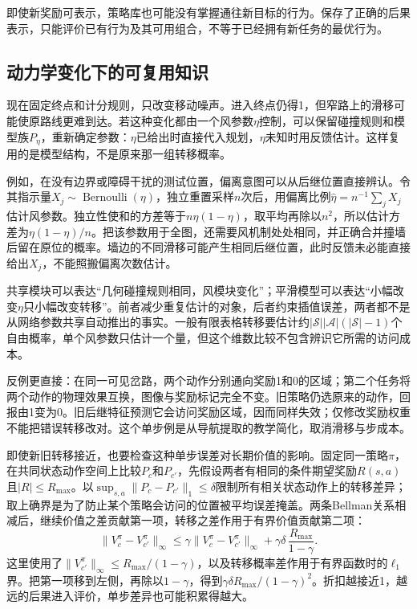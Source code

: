 即使新奖励可表示，策略库也可能没有掌握通往新目标的行为。保存了正确的后果表示，只能评价已有行为及其可用组合，不等于已经拥有新任务的最优行为。

\subsection{动力学变化下的可复用知识}
\label{sec:rl-transfer-dynamics-change}

现在固定终点和计分规则，只改变移动噪声。进入终点仍得1，但窄路上的滑移可能使原路线更难到达。若这种变化都由一个风参数$\eta$控制，可以保留碰撞规则和模型族$P_\eta$，重新确定参数：$\eta$已给出时直接代入规划，$\eta$未知时用反馈估计。这样复用的是模型结构，不是原来那一组转移概率。

例如，在没有边界或障碍干扰的测试位置，偏离意图可以从后继位置直接辨认。令其指示量$X_j\sim\operatorname{Bernoulli}(\eta)$，独立重置采样$n$次后，用偏离比例$\widehat\eta=n^{-1}\sum_jX_j$估计风参数。独立性使和的方差等于$n\eta(1-\eta)$，取平均再除以$n^2$，所以估计方差为$\eta(1-\eta)/n$。把该参数用于全图，还需要风机制处处相同，并正确合并撞墙后留在原位的概率。墙边的不同滑移可能产生相同后继位置，此时反馈未必能直接给出$X_j$，不能照搬偏离次数估计。

共享模块可以表达“几何碰撞规则相同，风模块变化”；平滑模型可以表达“小幅改变$\eta$只小幅改变转移”。前者减少重复估计的对象，后者约束插值误差，两者都不是从网络参数共享自动推出的事实。一般有限表格转移要估计约$|\mathcal S||\mathcal A|(|\mathcal S|-1)$个自由概率，单个风参数只估计一个量，但这个维数比较不包含辨识它所需的访问成本。

反例更直接：在同一可见岔路，两个动作分别通向奖励1和0的区域；第二个任务将两个动作的物理效果互换，图像与奖励标记完全不变。旧策略仍选原来的动作，回报由1变为0。旧后继特征预测它会访问奖励区域，因而同样失效；仅修改奖励权重不能把错误转移改对。这个单步例是从导航提取的教学简化，取消滑移与步成本。

即使新旧转移接近，也要检查这种单步误差对长期价值的影响。固定同一策略$\pi$，在共同状态动作空间上比较$P_c$和$P_{c'}$，先假设两者有相同的条件期望奖励$R(s,a)$且$|R|\leq R_{\max}$。以$\sup_{s,a}\lVert P_c-P_{c'}\rVert_1\leq\delta$限制所有相关状态动作上的转移差异；取上确界是为了防止某个策略会访问的位置被平均误差掩盖。两条Bellman关系相减后，继续价值之差贡献第一项，转移之差作用于有界价值贡献第二项：
\[
 \lVert V_c^\pi-V_{c'}^\pi\rVert_\infty
 \leq \gamma\lVert V_c^\pi-V_{c'}^\pi\rVert_\infty
      +\gamma\delta\,\frac{R_{\max}}{1-\gamma}.
\]
这里使用了$\lVert V_{c'}^\pi\rVert_\infty\leq R_{\max}/(1-\gamma)$，以及转移概率差作用于有界函数时的$\ell_1$界。把第一项移到左侧，再除以$1-\gamma$，得到$\gamma\delta R_{\max}/(1-\gamma)^2$。折扣越接近1，越远的后果进入评价，单步差异也可能积累得越大。

